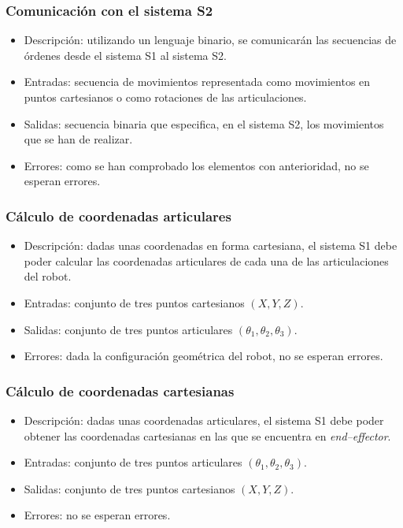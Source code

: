 \subsubsection{Comunicación con el sistema \ac{S2}}
\begin{itemize}
    \item Descripción: utilizando un lenguaje binario, se comunicarán las secuencias de órdenes desde el sistema \ac{S1} al sistema \ac{S2}.
    \item Entradas: secuencia de movimientos representada como movimientos en puntos cartesianos o como rotaciones de las articulaciones.
    \item Salidas: secuencia binaria que especifica, en el sistema \ac{S2}, los movimientos que se han de realizar.
    \item Errores: como se han comprobado los elementos con anterioridad, no se esperan errores.
\end{itemize}

\subsubsection{Cálculo de coordenadas articulares}
\begin{itemize}
    \item Descripción: dadas unas coordenadas en forma cartesiana, el sistema \ac{S1} debe poder calcular las coordenadas articulares de cada una de las articulaciones del robot.
    \item Entradas: conjunto de tres puntos cartesianos $(X,Y,Z)$.
    \item Salidas: conjunto de tres puntos articulares $(\theta_1, \theta_2, \theta_3)$.
    \item Errores: dada la configuración geométrica del robot, no se esperan errores.
\end{itemize}

\subsubsection{Cálculo de coordenadas cartesianas}
\begin{itemize}
    \item Descripción: dadas unas coordenadas articulares, el sistema \ac{S1} debe poder obtener las coordenadas cartesianas en las que se encuentra en \textit{end--effector}.
    \item Entradas: conjunto de tres puntos articulares $(\theta_1, \theta_2, \theta_3)$.
    \item Salidas: conjunto de tres puntos cartesianos $(X,Y,Z)$.
    \item Errores: no se esperan errores.
\end{itemize}

